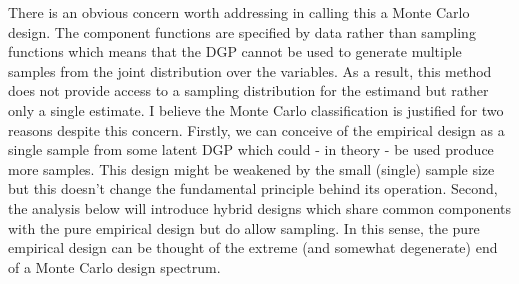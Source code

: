 \documentclass[../main.tex]{subfiles}
\begin{document}
\vspace{\baselineskip}
There is an obvious concern worth addressing in calling this a Monte Carlo design. The component functions are specified by data rather than sampling functions which means that the DGP cannot be used to generate multiple samples from the joint distribution over the variables. As a result, this method does not provide access to a sampling distribution for the estimand but rather only a single estimate. I believe the Monte Carlo classification is justified for two reasons despite this concern. Firstly, we can conceive of the empirical design as a single sample from some latent DGP which could - in theory - be used produce more samples. This design might be weakened by the small (single) sample size but this doesn’t change the fundamental principle behind its operation. Second, the analysis below will introduce hybrid designs which share common components with the pure empirical design but do allow sampling. In this sense, the pure empirical design can be thought of the extreme (and somewhat degenerate) end of a Monte Carlo design spectrum.\par

\vspace{\baselineskip}
\end{document}
